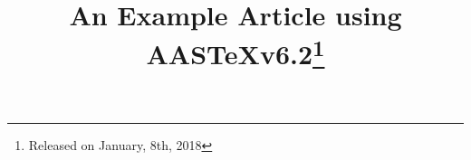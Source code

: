 \documentclass{aastex62}
\newcommand\aastex{AAS\TeX}
\begin{document}
\title{An Example Article using \aastex v6.2\footnote{Released on January, 8th, 2018}}


\end{document}
